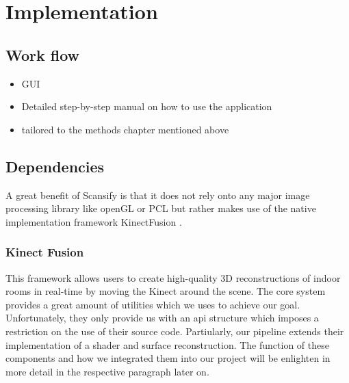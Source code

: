 

%
%

\sectionfix
\section{Implementation}
\label{sec:implementation}
\subsection{Work flow}
\begin{itemize}
\item GUI
\item Detailed step-by-step manual on how to use the application
\item tailored to the methods chapter mentioned above
\end{itemize}
\subsection{Dependencies}
A great benefit of Scansify is that it does not rely onto any major image processing library like openGL or PCL but rather makes use of the native implementation framework KinectFusion \cite{Izadi:2011:KRR:2047196.2047270}. 
\subsubsection{Kinect Fusion}
This framework allows users to create high-quality 3D reconstructions of indoor rooms in real-time by moving the Kinect around the scene. The core system provides a great amount of utilities which we uses to achieve our goal. Unfortunately, they only provide us with an api structure which imposes a restriction on the use of their source code. Partiularly, our pipeline extends their implementation of a shader and surface reconstruction.
The function of these components and how we integrated them into our project will be enlighten in more detail in the respective paragraph later on.
